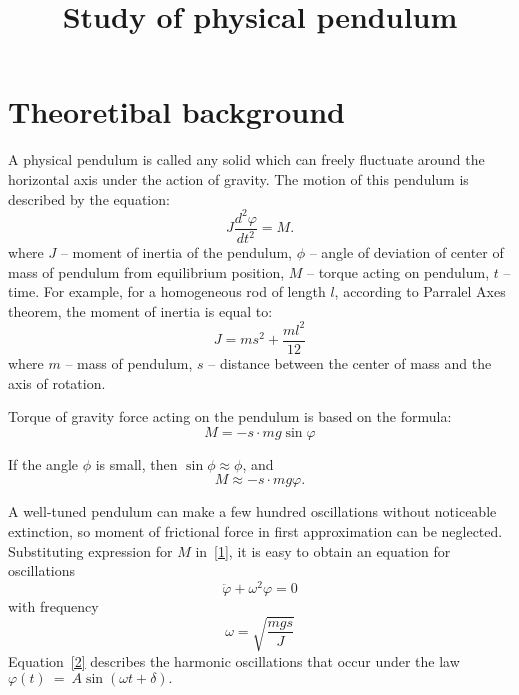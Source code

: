 \documentclass{LabWorkEng}
\title{Study of physical pendulum}
\begin{document}
\writedatatofile{\jobname}
\maketitle

\nocite{IrodovMechanics, BerkeleyMechanics, FLF1, Holyday}
\printbibliography

\section{Theoretibal background}

A physical pendulum is called any solid which can freely fluctuate around the horizontal axis under the action of gravity. The motion of this pendulum is described by the equation:
\begin{equation}\label{1}
	J\frac{d^2\varphi}{dt^2} = M.
\end{equation}
where $J$ -- moment of inertia of the pendulum, $\phi$  -- angle of deviation of center of mass of pendulum from equilibrium position, $M$ -- torque acting on pendulum, $t$ -- time. For example, for a homogeneous rod of length $l$, according to Parralel Axes theorem, the moment of inertia is equal to:
\begin{equation}\label{2}
	J = ms^2 + \frac{ml^2}{12}
\end{equation}
where $m$ -- mass of pendulum, $s$ -- distance between the center of mass and the axis of rotation.

Torque of gravity force acting on the pendulum is based on the formula:
\begin{equation*}
	M =  - s \cdot mg \sin \varphi
\end{equation*}

If the angle $\phi$ is small, then $\sin\phi \approx \phi$, and
\begin{equation*}
	M \approx  - s \cdot mg \varphi .
\end{equation*}

A well-tuned pendulum can make a few hundred oscillations without noticeable extinction, so moment of frictional force in first approximation can be neglected. Substituting expression for $M$ in~\eqref{1}, it is easy to obtain an equation for oscillations
\begin{equation}\label{2}
	\ddot \varphi  + {\omega ^2}\varphi  = 0
\end{equation}
with frequency
\begin{equation}\label{3}
	\omega  = \sqrt {\frac{{mgs}}{J}}
\end{equation}
Equation~\eqref{2} describes the harmonic oscillations that occur under the law \(\varphi \left( t \right)~=~A\sin \left( {\omega t + \delta } \right).\)
\end{document}
